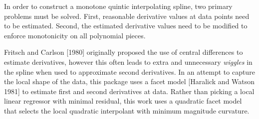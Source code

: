

In order to construct a monotone quintic interpolating spline, two
primary problems must be solved. First, reasonable derivative values
at data points need to be estimated. Second, the estimated derivative
values need to be modified to enforce monotonicity on all polynomial
pieces.


Fritsch and Carlson [1980] originally proposed the use of central
differences to estimate derivatives, however this often leads to extra
and unnecessary {\it wiggles} in the spline when used to approximate
second derivatives. In an attempt to capture the local shape of the
data, this package uses a facet model [Haralick and Watson 1981] to
estimate first and second derivatives at data. Rather than picking a
local linear regressor with minimal residual, this work uses a
quadratic facet model that selects the local quadratic interpolant
with minimum magnitude curvature.

